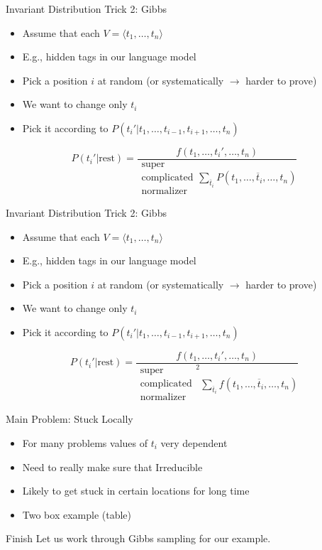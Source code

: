 \documentclass[11pt]{beamer}
\begin{document}
	\begin{frame}{Invariant Distribution Trick 2: Gibbs}
		\begin{itemize} 
			\item Assume that each $V = \langle t_1, \dots, t_n \rangle$
			\item E.g., hidden tags in our language model 
			\item Pick a position $i$ at random (or systematically $\rightarrow$ harder to prove)
			\item We want to change only $t_i$
			\item Pick it according to $P(t_{i}'|t_1,\dots,t_{i-1},t_{i+1},\dots,t_n)$
		\end{itemize}
		
		$$P(t_{i}'|\mbox{rest}) = \frac{f(t_1,\dots,t_{i}',\dots,t_n)}{\substack{\mbox{super} \\ \mbox{complicated} \\ \mbox{normalizer}} \sum_{\overline{t}_i} P(t_1,\dots,\overline{t}_{i},\dots,t_n)}$$
	\end{frame}	
	
	\begin{frame}{Invariant Distribution Trick 2: Gibbs}
			\begin{itemize} 
				\item Assume that each $V = \langle t_1, \dots, t_n \rangle$
				\item E.g., hidden tags in our language model 
				\item Pick a position $i$ at random (or systematically $\rightarrow$ harder to prove)
				\item We want to change only $t_i$
				\item Pick it according to $P(t_{i}'|t_1,\dots,t_{i-1},t_{i+1},\dots,t_n)$
			\end{itemize}
			
			$$P(t_{i}'|\mbox{rest}) = \frac{f(t_1,\dots,t_{i}',\dots,t_n)}{\substack{\mbox{super} \\ \mbox{complicated} \\ \mbox{normalizer}}^2 \sum_{\overline{t}_i} f(t_1,\dots,\overline{t}_{i},\dots,t_n)}$$
	\end{frame}
	
	\begin{frame}{Main Problem: Stuck Locally}
		\begin{itemize}
			\item For many problems values of $t_i$ very dependent
			\item Need to really make sure that Irreducible
			\item Likely to get stuck in certain locations for long time
			\item Two box example (table)
		\end{itemize}
	\end{frame}
	
	\begin{frame}{Finish}
		Let us work through Gibbs sampling for our example.
	\end{frame}
	
\end{document}

